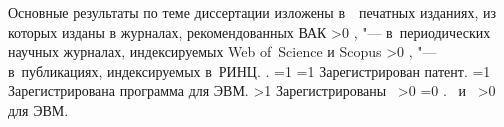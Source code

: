 {\begin{refsection}
{        \printbibliography[heading=nobibheading, section=1, env=countauthorscopuswos,    filter=scopuswos]}%
        \nocite{*}%
        {\publications} Основные результаты по теме диссертации изложены в~~печатных изданиях,
         из которых изданы в журналах, рекомендованных ВАК%
        \ifnum \value{citeauthorscopuswos}>0%
            ,  "--- в~периодических научных журналах, индексируемых Web of~Science и Scopus%
        \fi%
        \ifnum \value{citeauthorrinz}>0%
            ,  "--- в~публикациях, индексируемых в~РИНЦ.
        \else%
            .
        \fi%
        \ifnum \value{citeregistered}=1%
            \ifnum \value{citeauthorpatent}=1%
                Зарегистрирован  патент.
            \fi%
            \ifnum \value{citeauthorprogram}=1%
                Зарегистрирована  программа для ЭВМ.
            \fi%
        \fi%
        \ifnum \value{citeregistered}>1%
            Зарегистрированы\ %
            \ifnum \value{citeauthorpatent}>0%
            \ifnum \value{citeauthorprogram}=0 . \else \ и~\fi%
            \fi%
            \ifnum \value{citeauthorprogram}>0%
             для ЭВМ.
            \fi%
        \fi%
    \end{refsection}%
    \begin{refsection}
    \end{refsection}%
}


